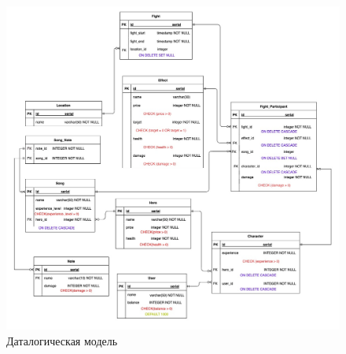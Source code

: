 \begin{figure}[H]
	\begin{center}
		\includegraphics[scale=0.44]{images/Datalogical.jpg}
		\caption{Даталогическая модель}
		\label{pic:pic_name} %
	\end{center}
\end{figure}